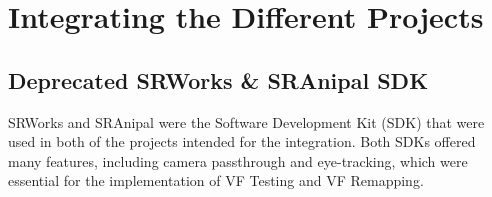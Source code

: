 \documentclass{l4proj}
\begin{document}

\section{Integrating the Different Projects}





\subsection{Deprecated SRWorks \& SRAnipal SDK}
SRWorks and SRAnipal were the Software Development Kit (SDK) that were used in both of the projects intended for the integration. Both SDKs offered many features, including camera passthrough and eye-tracking, which were essential for the implementation of VF Testing and VF Remapping.
\end{document}
